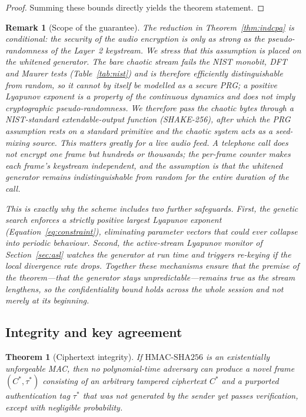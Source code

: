 \documentclass[pdflatex,sn-mathphys-num]{sn-jnl}%
\theoremstyle{thmstyleone}%
\newtheorem{theorem}{Theorem}%
\theoremstyle{thmstyletwo}%
\newtheorem{remark}{Remark}%
\theoremstyle{thmstylethree}%
\begin{document}
\begin{proof}
Summing these bounds directly yields the theorem statement.
\end{proof}

\begin{remark}[Scope of the guarantee]
\label{rem:scope}
The reduction in Theorem~\ref{thm:indcpa} is \emph{conditional}: the security of the audio encryption is only as strong as the pseudo-randomness of the Layer~2 keystream. We stress that this assumption is placed on the \emph{whitened} generator. The bare chaotic stream fails the NIST monobit, DFT and Maurer tests (Table~\ref{tab:nist}) and is therefore efficiently distinguishable from random, so it cannot by itself be modelled as a secure PRG; a positive Lyapunov exponent is a property of the continuous dynamics and does not imply cryptographic pseudo-randomness. We therefore pass the chaotic bytes through a NIST-standard extendable-output function (SHAKE-256), after which the PRG assumption rests on a standard primitive and the chaotic system acts as a seed-mixing source. This matters greatly for a live audio feed. A telephone call does not encrypt one frame but hundreds or thousands; the per-frame counter makes each frame's keystream independent, and the assumption is that the whitened generator remains indistinguishable from random for the entire duration of the call.

This is exactly why the scheme includes two further safeguards. First, the genetic search enforces a strictly positive largest Lyapunov exponent (Equation~\eqref{eq:constraint}), eliminating parameter vectors that could ever collapse into periodic behaviour. Second, the active-stream Lyapunov monitor of Section~\ref{sec:asl} watches the generator at run time and triggers re-keying if the local divergence rate drops. Together these mechanisms ensure that the premise of the theorem---that the generator stays unpredictable---remains true as the stream lengthens, so the confidentiality bound holds across the whole session and not merely at its beginning.
\end{remark}

\subsection{Integrity and key agreement}

\begin{theorem}[Ciphertext integrity]
\label{thm:int}
If $\mathrm{HMAC\text{-}SHA256}$ is an existentially unforgeable MAC, then no polynomial-time adversary can produce a novel frame $(C^\ast,\tau^\ast)$ consisting of an arbitrary tampered ciphertext $C^\ast$ and a purported authentication tag $\tau^\ast$ that was not generated by the sender yet passes verification, except with negligible probability.
\end{theorem}
\end{document}
